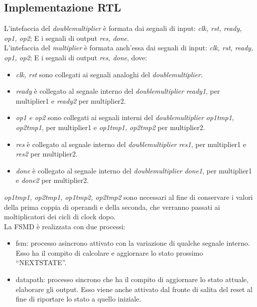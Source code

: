 \documentclass[]{IEEEtran}
\begin{document}
\subsection{Implementazione RTL}
L'intefaccia del {\it double\textunderscore multiplier} è formata dai segnali di input: {\it clk, rst, ready, op1, op2}; E i segnali di output {\it res, done}. \\
L'intefaccia del {\it multiplier} è formata anch'essa dai segnali di input: {\it clk, rst, ready, op1, op2}; E i segnali di output {\it res, done}, dove:
\begin{itemize}
\item {\it clk, rst} sono collegati ai segnali analoghi del {\it double\textunderscore multiplier}.
\item {\it ready} è collegato al segnale interno del {\it double\textunderscore multiplier} {\it ready1}, per multiplier1 e {\it ready2} per multiplier2.
\item {\it op1 e op2} sono collegati ai segnali interni del {\it double\textunderscore multiplier} {\it op1\textunderscore tmp1, op2\textunderscore tmp1}, per multiplier1 e {\it op1\textunderscore tmp1, op2\textunderscore tmp2} per multiplier2.
\item {\it res} è collegato al segnale interno del {\it double\textunderscore multiplier} {\it res1}, per multiplier1 e {\it res2} per multiplier2.
\item {\it done} è collegato al segnale interno del {\it double\textunderscore multiplier} {\it done1}, per multiplier1 e {\it done2} per multiplier2.
\end{itemize}
{\it op1\textunderscore tmp1, op2\textunderscore tmp1, op1\textunderscore tmp2, op2\textunderscore tmp2} sono necessari al fine di conservare i valori della prima coppia di operandi e della seconda, che verranno passati ai moltiplicatori dei cicli di clock dopo. \\
La FSMD è realizzata con due processi:
\begin{itemize}
\item fsm: processo asincrono attivato con la variazione di qualche segnale interno. Esso ha il compito di calcolare e aggiornare lo stato prossimo ``NEXT\textunderscore STATE''.
\item datapath: processo sincrono che ha il compito di aggiornare lo stato attuale, elaborare gli output. Esso viene anche attivato dal fronte di salita del reset al fine di riportare lo stato a quello iniziale.
\end{itemize}
\end{document}

